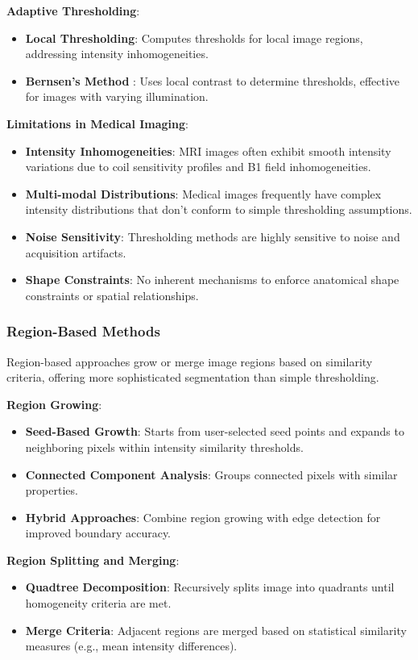 \documentclass[12pt,a4paper]{article}
\begin{document}
\textbf{Adaptive Thresholding}:
\begin{itemize}
    \item \textbf{Local Thresholding}: Computes thresholds for local image regions, addressing intensity inhomogeneities.
    \item \textbf{Bernsen's Method} \cite{bernsten1986dynamic}: Uses local contrast to determine thresholds, effective for images with varying illumination.
\end{itemize}

\textbf{Limitations in Medical Imaging}:
\begin{itemize}
    \item \textbf{Intensity Inhomogeneities}: MRI images often exhibit smooth intensity variations due to coil sensitivity profiles and B1 field inhomogeneities.
    \item \textbf{Multi-modal Distributions}: Medical images frequently have complex intensity distributions that don't conform to simple thresholding assumptions.
    \item \textbf{Noise Sensitivity}: Thresholding methods are highly sensitive to noise and acquisition artifacts.
    \item \textbf{Shape Constraints}: No inherent mechanisms to enforce anatomical shape constraints or spatial relationships.
\end{itemize}

\subsubsection{Region-Based Methods}

Region-based approaches grow or merge image regions based on similarity criteria, offering more sophisticated segmentation than simple thresholding.

\textbf{Region Growing}:
\begin{itemize}
    \item \textbf{Seed-Based Growth}: Starts from user-selected seed points and expands to neighboring pixels within intensity similarity thresholds.
    \item \textbf{Connected Component Analysis}: Groups connected pixels with similar properties.
    \item \textbf{Hybrid Approaches}: Combine region growing with edge detection for improved boundary accuracy.
\end{itemize}

\textbf{Region Splitting and Merging}:
\begin{itemize}
    \item \textbf{Quadtree Decomposition}: Recursively splits image into quadrants until homogeneity criteria are met.
    \item \textbf{Merge Criteria}: Adjacent regions are merged based on statistical similarity measures (e.g., mean intensity differences).
\end{itemize}
\end{document}
